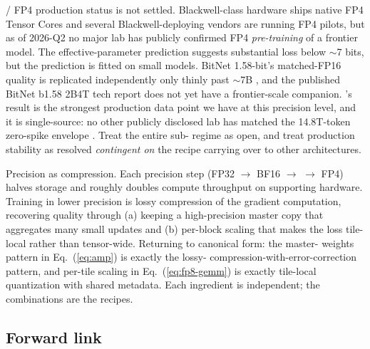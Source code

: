 \begin{contradiction}
 / FP4 production status is not settled. Blackwell-class
hardware ships native FP4 Tensor Cores and several Blackwell-deploying
vendors are running FP4 pilots, but as of 2026-Q2 no major lab has
publicly confirmed FP4 \emph{pre-training} of a frontier model. The
\citet{scaling-laws-precision-2024} effective-parameter prediction
suggests substantial loss below $\sim$7 bits, but the prediction is
fitted on small models. BitNet 1.58-bit's matched-FP16 quality
\citep{ma2024-bitnet} is replicated independently only thinly past
$\sim$7B , and the published BitNet b1.58 2B4T tech report
\citep{bitnet-2b4t-2025} does not yet have a frontier-scale companion.
's  result is the strongest production data point we
have at this precision level, and it is single-source: no other
publicly disclosed lab has matched the 14.8T-token zero-spike 
envelope \citep[abstract]{deepseek-v3}. Treat the entire sub-
regime as open, and treat  production stability as resolved
\emph{contingent on} the  recipe carrying over to other
architectures.
\end{contradiction}

\begin{intuition}
Precision as compression. Each precision step (FP32 $\to$ BF16 $\to$
 $\to$ FP4) halves storage and roughly doubles compute throughput
on supporting hardware. Training in lower precision is lossy
compression of the gradient computation, recovering quality through
(a) keeping a high-precision master copy that aggregates many small
updates and (b) per-block scaling that makes the loss tile-local
rather than tensor-wide. Returning to canonical form: the master-
weights pattern in Eq.~(\ref{eq:amp}) is exactly the lossy-
compression-with-error-correction pattern, and per-tile scaling in
Eq.~(\ref{eq:fp8-gemm}) is exactly tile-local quantization with
shared metadata. Each ingredient is independent; the combinations are
the recipes.
\end{intuition}

\subsection{Forward link}
\label{sec:mp-forward}


